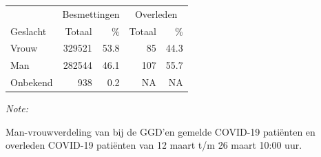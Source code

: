 \documentclass[
  english,
  man,floatsintext]{apa6}
\begin{document}
\begin{table}
\centering\begingroup\fontsize{11}{13}\selectfont

\begin{threeparttable}
\begin{tabular}{lrrrr}
\toprule
\multicolumn{1}{c}{ } & \multicolumn{2}{c}{Besmettingen} & \multicolumn{2}{c}{Overleden} \\
\cmidrule(l{3pt}r{3pt}){2-3} \cmidrule(l{3pt}r{3pt}){4-5}
Geslacht & Totaal & \% & Totaal & \%\\
\midrule
Vrouw & 329521 & 53.8 & 85 & 44.3\\
Man & 282544 & 46.1 & 107 & 55.7\\
Onbekend & 938 & 0.2 & NA & NA\\
\bottomrule
\end{tabular}
\begin{tablenotes}
\item \textit{Note: } 
\item Man-vrouwverdeling van bij de GGD’en gemelde COVID-19 patiënten en overleden COVID-19 patiënten van 12 maart t/m 26 maart 10:00 uur.
\end{tablenotes}
\end{threeparttable}
\endgroup{}
\end{table}
\newpage
\end{document}
